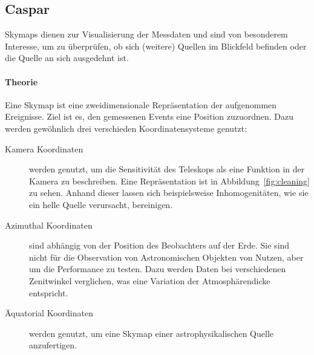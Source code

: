 \subsection{Caspar}%
\label{sub:caspar}


Skymaps dienen zur Visualisierung der Messdaten und sind von besonderem
Interesse, um zu überprüfen, ob sich (weitere) Quellen im Blickfeld befinden
oder die Quelle an sich ausgedehnt ist.

\paragraph{Theorie}%

Eine Skymap ist eine zweidimensionale Repräsentation der aufgenommen Ereignisse.
Ziel ist es, den gemessenen Events eine Position zuzuordnen.
Dazu werden ge\-wöhn\-lich drei verschieden Koordinatensysteme genutzt:

\begin{description}
  \item[\quad Kamera Koordinaten] werden genutzt, um die Sensitivität des
    Teleskops
    als eine Funktion in der Kamera zu beschreiben.
    Eine Repräsentation ist in Abbildung~\ref{fig:cleaning} zu sehen.
    Anhand dieser lassen sich beispielsweise Inhomogenitäten,
    wie sie ein helle Quelle verursacht, bereinigen.
  \item[\quad Azimuthal Koordinaten] sind abhängig von der Position des
    Beobachters auf der Erde.
    Sie sind nicht für die Observation von Astronomischen Objekten von Nutzen,
    aber um die Performance zu testen.
    Dazu werden Daten bei verschiedenen Zenitwinkel verglichen,
    was eine Variation der Atmosphärendicke entspricht.
  \item[\quad Äquatorial Koordinaten] werden genutzt, um eine Skymap einer astrophysikalischen Quelle anzufertigen.
\end{description}

